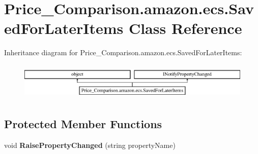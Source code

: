 \hypertarget{class_price___comparison_1_1amazon_1_1ecs_1_1_saved_for_later_items}{\section{Price\-\_\-\-Comparison.\-amazon.\-ecs.\-Saved\-For\-Later\-Items Class Reference}
\label{class_price___comparison_1_1amazon_1_1ecs_1_1_saved_for_later_items}
}


 


Inheritance diagram for Price\-\_\-\-Comparison.\-amazon.\-ecs.\-Saved\-For\-Later\-Items\-:\begin{figure}[H]
\begin{center}
\leavevmode
\includegraphics[height=1.794872cm]{class_price___comparison_1_1amazon_1_1ecs_1_1_saved_for_later_items}
\end{center}
\end{figure}
\subsection*{Protected Member Functions}
\begin{DoxyCompactItemize}
\item 
\hypertarget{class_price___comparison_1_1amazon_1_1ecs_1_1_saved_for_later_items_a653a5d97cc8834fab1cf0d9b6436a14a}{void {\bfseries Raise\-Property\-Changed} (string property\-Name)}\label{class_price___comparison_1_1amazon_1_1ecs_1_1_saved_for_later_items_a653a5d97cc8834fab1cf0d9b6436a14a}

\end{DoxyCompactItemize}
